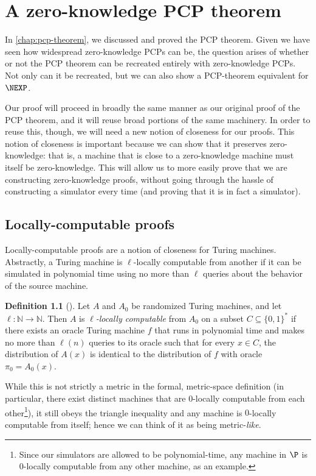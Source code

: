 \documentclass[english,12pt]{reedthesis}
\theoremstyle{plain}
\theoremstyle{definition}
\newtheorem{defn}[defn]{Definition}
\theoremstyle{remark}
\begin{document}
\chapter{A zero-knowledge PCP theorem}\label{chap:zk-pcp-theorem}

In \cref{chap:pcp-theorem}, we discussed and proved the PCP theorem. Given we
have seen how widespread zero-knowledge PCPs can be, the question arises of
whether or not the PCP theorem can be recreated entirely with zero-knowledge
PCPs. Not only can it be recreated, but we can also show a PCP-theorem
equivalent for $\NEXP$.

Our proof will proceed in broadly the same manner as our original proof of the
PCP theorem, and it will reuse broad portions of the same machinery. In order to
reuse this, though, we will need a new notion of closeness for our proofs. This
notion of closeness is important because we can show that it preserves
zero-knowledge: that is, a machine that is close to a zero-knowledge machine
must itself be zero-knowledge. This will allow us to more easily prove that we
are constructing zero-knowledge proofs, without going through the hassle of
constructing a simulator every time (and proving that it is in fact a
simulator).

\section{Locally-computable proofs}\label{sec:loc-comp-proof}

Locally-computable proofs are a notion of closeness for Turing machines.
Abstractly, a Turing machine is $\ell$-locally computable from another if it can be
simulated in polynomial time using no more than $\ell$ queries about the behavior
of the source machine.

\begin{defn}[{\cite[Def.\ 3.1]{GOS25}}]\label{def:loc-comp}%
   Let $A$ and $A_{0}$ be randomized Turing
  machines, and let $\ell\colon \mathbb{N} \rightarrow \mathbb{N}$. Then $A$ is \emph{$\ell$-locally computable}
  from $A_{0}$ on a subset $C \subseteq \{0, 1\}^{*}$ if there exists an oracle Turing
  machine $f$ that runs in polynomial time and makes no more than $\ell(n)$ queries
  to its oracle such that for every $x \in C$, the distribution of $A(x)$ is
  identical to the distribution of $f$ with oracle $\pi_{0} = A_{0}(x)$.
\end{defn}

While this is not strictly a metric in the formal, metric-space definition (in
particular, there exist distinct machines that are $0$-locally computable from
each other\footnote{Since our simulators are allowed to be polynomial-time, any
  machine in $\P$ is $0$-locally computable from any other machine, as an
  example.}), it still obeys the triangle inequality and any machine is
$0$-locally computable from itself; hence we can think of it as being
metric-\emph{like}.
\end{document}
